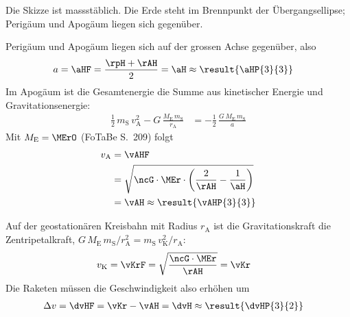 \begin{abcliste}
\abc Die Skizze ist massstäblich. Die Erde steht im Brennpunkt der Übergangsellipse; Perigäum und Apogäum liegen sich gegenüber.

\begin{center}
\end{center}

\abc Perigäum und Apogäum liegen sich auf der grossen Achse gegenüber, also
\begin{align}
 a &= \aHF = \frac{\rpH+\rAH}{2} = \aH \approx \result{\aHP{3}{3}}
\end{align}
Im Apogäum ist die Gesamtenergie die Summe aus kinetischer Energie und Gravitationsenergie:
\begin{align}
 \frac{1}{2}\,m_\mathrm{S}\,v_\mathrm{A}^2-G\,\frac{M_\mathrm{E}\,m_\mathrm{S}}{r_\mathrm{A}} &= -\frac{1}{2}\,\frac{G\,M_\mathrm{E}\,m_\mathrm{S}}{a}
\end{align}
Mit $M_\mathrm{E} = \MErO$ (FoTaBe S.~209) folgt
\begin{align}
 v_\mathrm{A} &= \vAHF \\
   &= \sqrt{\ncG\cdot\MEr\cdot\left(\frac{2}{\rAH}-\frac{1}{\aH}\right)} \\
   &= \vAH \approx \result{\vAHP{3}{3}}
\end{align}

\abc Auf der geostationären Kreisbahn mit Radius $r_\mathrm{A}$ ist die Gravitationskraft die Zentripetalkraft, $G\,M_\mathrm{E}\,m_\mathrm{S}/r_\mathrm{A}^2 = m_\mathrm{S}\,v_\mathrm{K}^2/r_\mathrm{A}$:
\begin{align}
 v_\mathrm{K} &= \vKrF = \sqrt{\frac{\ncG\cdot\MEr}{\rAH}} = \vKr
\end{align}
Die Raketen müssen die Geschwindigkeit also erhöhen um
\begin{align}
 \Delta v &= \dvHF = \vKr-\vAH = \dvH \approx \result{\dvHP{3}{2}}
\end{align}
\end{abcliste}
